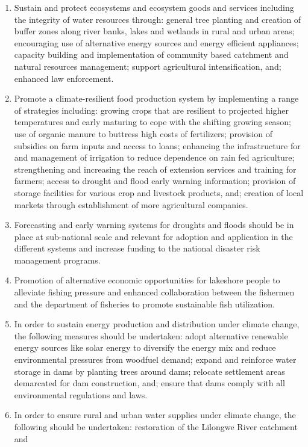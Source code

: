 \documentclass[
]{book}
\begin{document}
\begin{enumerate}
\def\labelenumi{\arabic{enumi}.}
\item
  Sustain and protect ecosystems and ecosystem goods and services including the integrity of water resources through: general tree planting and creation of
  buffer zones along river banks, lakes and wetlands in rural and urban areas; encouraging use of alternative energy sources and energy efficient appliances;
  capacity building and implementation of community based catchment and natural resources management; support agricultural intensification, and; enhanced law
  enforcement.
\item
  Promote a climate-resilient food production system by implementing a range of strategies including: growing crops that are resilient to projected higher
  temperatures and early maturing to cope with the shifting growing season; use of organic manure to buttress high costs of fertilizers; provision of subsidies on
  farm inputs and access to loans; enhancing the infrastructure for and management of irrigation to reduce dependence on rain fed agriculture; strengthening and
  increasing the reach of extension services and training for farmers; access to drought and flood early warning information; provision of storage facilities for
  various crop and livestock products, and; creation of local markets through establishment of more agricultural companies.
\item
  Forecasting and early warning systems for droughts and floods should be in place at sub-national scale and relevant for adoption and application in the
  different systems and increase funding to the national disaster risk management programs.
\item
  Promotion of alternative economic opportunities for lakeshore people to alleviate fishing pressure and enhanced collaboration between the fishermen and the
  department of fisheries to promote sustainable fish utilization.
\item
  In order to sustain energy production and distribution under climate change, the following measures should be undertaken: adopt alternative renewable energy
  sources like solar energy to diversify the energy mix and reduce environmental pressures from woodfuel demand; expand and reinforce water storage in dams by
  planting trees around dams; relocate settlement areas demarcated for dam construction, and; ensure that dams comply with all environmental regulations and laws.
\item
  In order to ensure rural and urban water supplies under climate change, the following should be undertaken: restoration of the Lilongwe River catchment and

\end{enumerate}
\end{document}
